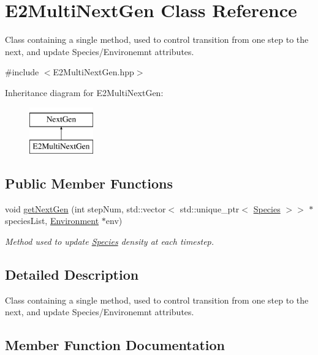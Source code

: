 \hypertarget{classE2MultiNextGen}{}\section{E2\+Multi\+Next\+Gen Class Reference}
\label{classE2MultiNextGen}


Class containing a single method, used to control transition from one step to the next, and update Species/\+Environemnt attributes.  




{\ttfamily \#include $<$E2\+Multi\+Next\+Gen.\+hpp$>$}

Inheritance diagram for E2\+Multi\+Next\+Gen\+:\begin{figure}[H]
\begin{center}
\leavevmode
\includegraphics[height=2.000000cm]{classE2MultiNextGen}
\end{center}
\end{figure}
\subsection*{Public Member Functions}
\begin{DoxyCompactItemize}
\item 
void \hyperlink{classE2MultiNextGen_a22721fa0e9c2cbe1de3d0d6bb78932f0}{get\+Next\+Gen} (int step\+Num, std\+::vector$<$ std\+::unique\+\_\+ptr$<$ \hyperlink{classSpecies}{Species} $>$$>$ $\ast$species\+List, \hyperlink{classEnvironment}{Environment} $\ast$env)
\begin{DoxyCompactList}\small\item\em Method used to update \hyperlink{classSpecies}{Species} density at each timestep. \end{DoxyCompactList}\end{DoxyCompactItemize}


\subsection{Detailed Description}
Class containing a single method, used to control transition from one step to the next, and update Species/\+Environemnt attributes. 

\subsection{Member Function Documentation}
\mbox{\label{classE2MultiNextGen_a22721fa0e9c2cbe1de3d0d6bb78932f0}} 
